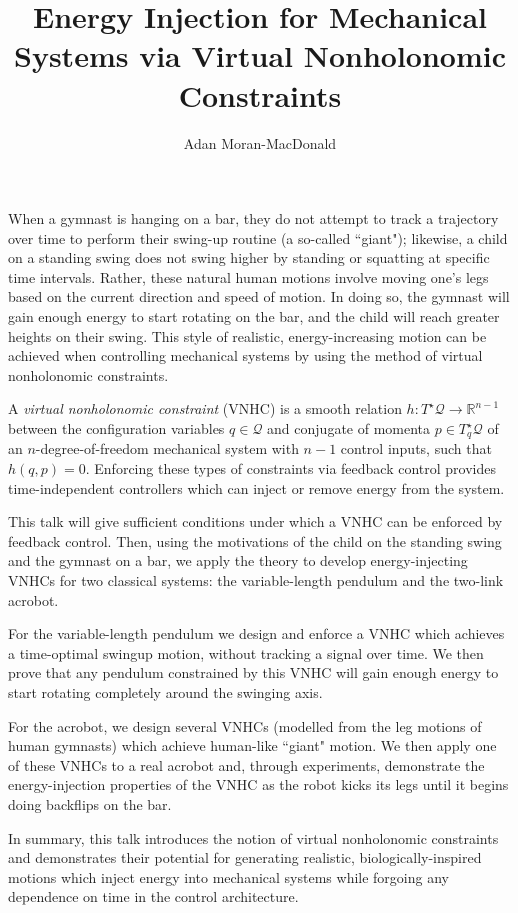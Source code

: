 \documentclass[12pt]{article}
\begin{document}
\title{Energy Injection for Mechanical Systems via Virtual Nonholonomic Constraints}
\author{Adan Moran-MacDonald}
\maketitle

When a gymnast is hanging on a bar, they do not attempt to track a trajectory
over time to perform their swing-up routine (a so-called ``giant");
likewise, a child on a standing swing does not swing higher by standing or
squatting at specific time intervals. 
Rather, these natural human motions involve moving one's legs based on the
current direction and speed of motion. 
In doing so, the gymnast will gain enough energy to start rotating on the bar,
and the child will reach greater heights on their swing. 
This style of realistic, energy-increasing motion can be achieved when
controlling mechanical systems by using the method of virtual nonholonomic
constraints.

A \textit{virtual nonholonomic constraint} (VNHC) is a smooth relation 
\(
    h : T^\star \mathcal{Q} \rightarrow \mathbb{R}^{n-1}
\) 
between the configuration variables \(q \in \mathcal{Q}\) and conjugate of
momenta \(p \in T_q^\star\mathcal{Q}\) of an \(n\)-degree-of-freedom mechanical
system with \(n-1\) control inputs, such that \(h(q,p) = 0\).
Enforcing these types of constraints via feedback control provides
time-independent controllers which can inject or remove energy from the system.

This talk will give sufficient conditions under which a VNHC can be enforced by
feedback control.
Then, using the motivations of the child on the standing swing and the gymnast
on a bar, we apply the theory to develop energy-injecting VNHCs for two
classical systems: the variable-length pendulum and the two-link acrobot. 

For the variable-length pendulum we design and enforce a VNHC which achieves a
time-optimal swingup motion, without tracking a signal over time. 
We then prove that any pendulum constrained by this VNHC will gain
enough energy to start rotating completely around the swinging axis.

For the acrobot, we design several VNHCs (modelled from the leg motions of human
gymnasts) which achieve human-like ``giant" motion.
We then apply one of these VNHCs to a real acrobot and, through experiments,
demonstrate the energy-injection properties of the VNHC as the robot kicks its
legs until it begins doing backflips on the bar. 

In summary, this talk introduces the notion of virtual nonholonomic constraints
and demonstrates their potential for generating realistic, biologically-inspired
motions which inject energy into mechanical systems while forgoing any
dependence on time in the control architecture.

\end{document}
